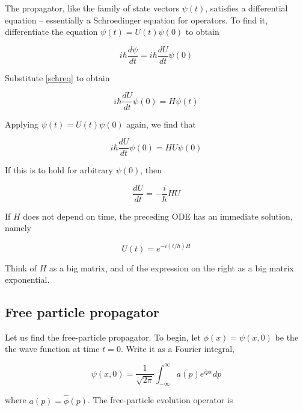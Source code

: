 The propagator, like the family of state vectors $\psi(t)$, satisfies a differential equation -- essentially a Schroedinger equation for operators.  To find it, differentiate the  equation $\psi(t) = U(t)\psi(0)$ to obtain

\begin{equation}
i\hbar \frac{d\psi}{dt} = i\hbar \frac{dU}{dt}\psi(0)
\end{equation}

Substitute \eqref{schreq} to obtain

\begin{equation}
i\hbar \frac{dU}{dt}\psi(0)  = H\psi(t)
\end{equation}

Applying $\psi(t) = U(t)\psi(0)$ again, we find that

\begin{equation}
i\hbar \frac{dU}{dt}\psi(0) = HU\psi(0)
\end{equation}

If this is to hold for arbitrary $\psi(0)$, then

\begin{equation}
\label{uevolutionode}
\frac{dU}{dt} = -\frac{i}{\hbar}HU
\end{equation}

If $H$ does not depend on time, the preceding  ODE has an immediate solution, namely


\begin{equation}
U(t) = e^{-i(t/\hbar) H}
\end{equation}

Think of $H$ as a big matrix, and of the expression on the right as a big matrix exponential.






\subsection{Free particle propagator}


Let us find the free-particle propagator. To begin, let $\phi(x) = \psi(x,0)$ be the the wave function at time $t = 0$.  Write it as a Fourier integral,

\begin{equation}
\psi(x,0) = \frac{1}{\sqrt{2\pi}}\int_{-\infty}^\infty a(p) e^{ipx} dp
\end{equation}

where $a(p) = \hat\phi(p)$.
The free-particle evolution operator is

